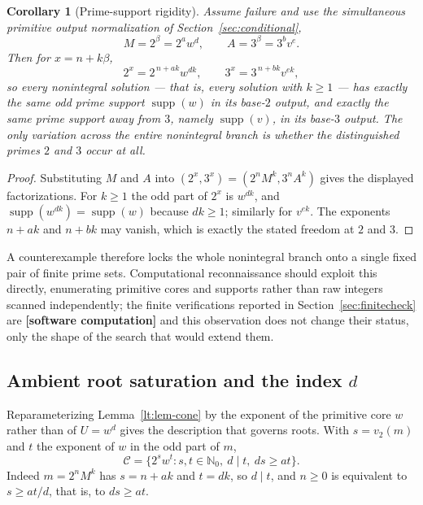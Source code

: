 \documentclass[11pt,oneside]{article}
\newtheorem{corollary}[theorem]{Corollary}
\theoremstyle{definition}
\theoremstyle{remark}
\newcommand{\Nzero}{\mathbb N_0}
\newcommand{\Cand}{\mathcal C}
\newcommand{\vpp}[2]{v_{#1}\!\left(#2\right)}
\newcommand{\statuscomp}{\textcolor{computeviolet}{\textbf{[software computation]}}}
\begin{document}
\begin{corollary}[Prime-support rigidity]
\label{lt:cor-prime-support}
Assume failure and use the simultaneous primitive output normalization of
Section~\ref{sec:conditional},
\[
 M=2^{\beta}=2^aw^d,
 \qquad
 A=3^{\beta}=3^bv^e .
\]
Then for $x=n+k\beta$,
\[
 2^x=2^{\,n+ak}w^{dk},
 \qquad
 3^x=3^{\,n+bk}v^{ek},
\]
so every nonintegral solution --- that is, every solution with $k\ge1$ --- has exactly the same
odd prime support $\operatorname{supp}(w)$ in its base-$2$ output, and exactly the same prime
support away from $3$, namely $\operatorname{supp}(v)$, in its base-$3$ output.  The only
variation across the entire nonintegral branch is whether the distinguished primes $2$ and $3$
occur at all.
\end{corollary}

\begin{proof}
Substituting $M$ and $A$ into $(2^x,3^x)=(2^nM^k,3^nA^k)$ gives the displayed factorizations.
For $k\ge1$ the odd part of $2^x$ is $w^{dk}$, and
$\operatorname{supp}(w^{dk})=\operatorname{supp}(w)$ because $dk\ge1$; similarly for $v^{ek}$.
The exponents $n+ak$ and $n+bk$ may vanish, which is exactly the stated freedom at $2$ and $3$.
\end{proof}

A counterexample therefore locks the whole nonintegral branch onto a single fixed pair of finite
prime sets.  Computational reconnaissance should exploit this directly, enumerating primitive
cores and supports rather than raw integers scanned independently; the finite verifications
reported in Section~\ref{sec:finitecheck} are \statuscomp{} and this observation does not change
their status, only the shape of the search that would extend them.

\subsection{Ambient root saturation and the index \texorpdfstring{$d$}{d}}

Reparameterizing Lemma~\ref{lt:lem-cone} by the exponent of the primitive core $w$ rather than
of $U=w^d$ gives the description that governs roots.  With $s=\vpp{2}{m}$ and $t$ the exponent
of $w$ in the odd part of $m$,
\begin{equation}
 \Cand=\{2^sw^t:s,t\in\Nzero,\ d\mid t,\ ds\ge at\}.
 \label{lt:eq-candidate-cone}
\end{equation}
Indeed $m=2^nM^k$ has $s=n+ak$ and $t=dk$, so $d\mid t$, and $n\ge0$ is equivalent to
$s\ge at/d$, that is, to $ds\ge at$.
\end{document}
